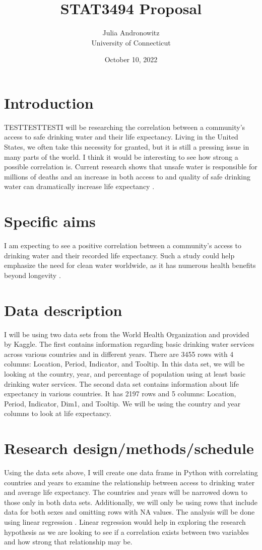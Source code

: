 \documentclass[12pt]{article}
\title{STAT3494 Proposal}
\author{Julia Andronowitz\\
University of Connecticut}
\date{October 10, 2022}
\begin{document}
\maketitle

\section{Introduction}
  TESTTESTTESTI will be researching the correlation between a community's access to safe drinking water and their life expectancy. Living in the United States, we often take this necessity for granted, but it is still a pressing issue in many parts of the world. I think it would be interesting to see how strong a possible correlation is. Current research shows that unsafe water is responsible for millions of deaths \citep{ritchieroser2019water} and an increase in both access to and quality of safe drinking water can dramatically increase life expectancy \citep{angelakis2021quality}.
\section{Specific aims}
  I am expecting to see a positive correlation between a community's access to drinking water and their recorded life expectancy. Such a study could help emphasize the need for clean water worldwide, as it has numerous health benefits beyond longevity \citep{popkin2010waterhealth}.
\section{Data description}
  I will be using two data sets from the World Health Organization and provided by Kaggle. The first contains information regarding basic drinking water services across various countries and in different years. There are 3455 rows with 4 columns: Location, Period, Indicator, and Tooltip. In this data set, we will be looking at the country, year, and percentage of population using at least basic drinking water services. The second data set contains information about life expectancy in various countries. It has 2197 rows and 5 columns: Location, Period, Indicator, Dim1, and Tooltip. We will be using the country and year columns to look at life expectancy.
\section{Research design/methods/schedule}
  Using the data sets above, I will create one data frame in Python with correlating countries and years to examine the relationship between access to drinking water and average life expectancy. The countries and years will be narrowed down to those only in both data sets. Additionally, we will only be using rows that include data for both sexes and omitting rows with NA values. The analysis will be done using linear regression \citep{james2021statisticallearning}. Linear regression would help in exploring the research hypothesis as we are looking to see if a correlation exists between two variables and how strong that relationship may be.
\end{document}
